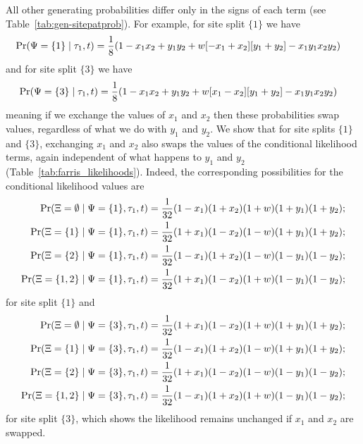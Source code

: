All other generating probabilities differ only in the signs of each term (see Table~\ref{tab:gen-sitepatprob}).
For example, for site split $\{1\}$ we have
\begin{align*}
    \Pr(\Psi=\{1\}\mid \tau_1, t) & = \frac{1}{8} (1 - x_1x_2 +  y_1y_2 +  w[-x_1 + x_2][y_1 + y_2] - x_1y_1x_2y_2)
\end{align*}
and for site split $\{3\}$ we have
\begin{align*}
    \Pr(\Psi=\{3\}\mid \tau_1, t) & = \frac{1}{8} (1 - x_1x_2 +  y_1y_2 +  w[x_1 - x_2][y_1 + y_2] - x_1y_1x_2y_2)
\end{align*}
meaning if we exchange the values of $x_1$ and $x_2$ then these probabilities swap values, regardless of what we do with $y_1$ and $y_2$.
We show that for site splits $\{1\}$ and $\{3\}$, exchanging $x_1$ and $x_2$ also swaps the values of the conditional likelihood terms, again independent of what happens to $y_1$ and $y_2$ (Table~\ref{tab:farris_likelihoods}).
Indeed, the corresponding possibilities for the conditional likelihood values are
\begin{align*}
    \Pr(\Xi=\emptyset \mid \Psi=\{1\}, \tau_1, t) &= \frac{1}{32}(1-x_1)(1+x_2)(1+w)(1+y_1)(1+y_2); \\
    \Pr(\Xi=\{1\} \mid \Psi=\{1\}, \tau_1, t) &= \frac{1}{32}(1+x_1)(1-x_2)(1-w)(1+y_1)(1+y_2); \\
    \Pr(\Xi=\{2\} \mid \Psi=\{1\}, \tau_1, t) &= \frac{1}{32}(1-x_1)(1+x_2)(1-w)(1-y_1)(1-y_2); \\
    \Pr(\Xi=\{1,2\} \mid \Psi=\{1\}, \tau_1, t) &= \frac{1}{32}(1+x_1)(1-x_2)(1+w)(1-y_1)(1-y_2);
\end{align*}
for site split $\{1\}$ and
\begin{align*}
        \Pr(\Xi=\emptyset \mid \Psi=\{3\}, \tau_1, t) &= \frac{1}{32}(1+x_1)(1-x_2)(1+w)(1+y_1)(1+y_2); \\
    \Pr(\Xi=\{1\} \mid \Psi=\{3\}, \tau_1, t) &= \frac{1}{32}(1-x_1)(1+x_2)(1-w)(1+y_1)(1+y_2); \\
    \Pr(\Xi=\{2\} \mid \Psi=\{3\}, \tau_1, t) &= \frac{1}{32}(1+x_1)(1-x_2)(1-w)(1-y_1)(1-y_2); \\
    \Pr(\Xi=\{1,2\} \mid \Psi=\{3\}, \tau_1, t) &= \frac{1}{32}(1-x_1)(1+x_2)(1+w)(1-y_1)(1-y_2);
\end{align*}
for site split $\{3\}$, which shows the likelihood remains unchanged if $x_1$ and $x_2$ are swapped.


